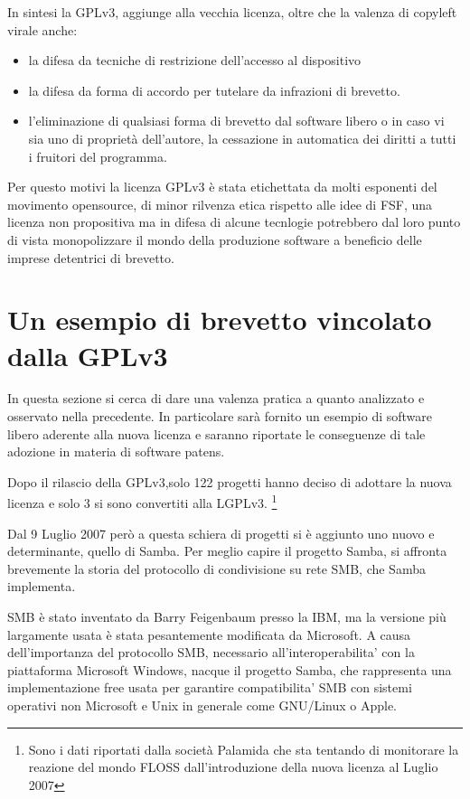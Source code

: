 In sintesi la GPLv3, aggiunge alla vecchia licenza, oltre che la valenza di copyleft virale anche:

\begin{itemize}
	\item  la difesa da tecniche di restrizione dell'accesso al dispositivo
	\item  la difesa da forma di accordo per tutelare da infrazioni di brevetto.
	\item  l'eliminazione di qualsiasi forma di brevetto dal software libero o in caso vi sia uno di proprietà dell'autore, la cessazione in automatica dei diritti a tutti i fruitori del programma.
\end{itemize}

Per questo motivi la licenza GPLv3 è stata etichettata da molti esponenti del movimento opensource, di minor rilvenza etica rispetto alle idee di FSF, una licenza non propositiva ma in difesa di alcune tecnlogie potrebbero dal loro punto di vista monopolizzare il mondo della produzione software a beneficio delle imprese detentrici di brevetto.





\section{Un esempio di brevetto vincolato dalla GPLv3}

In questa sezione si cerca di dare una valenza pratica a quanto analizzato e osservato nella precedente. In particolare sarà fornito un esempio di software libero aderente alla nuova licenza e saranno riportate le conseguenze di tale adozione in materia di software patens.

Dopo il rilascio della GPLv3,solo 122 progetti hanno deciso di adottare la nuova licenza e solo 3 si sono convertiti alla LGPLv3. \footnote{Sono i dati riportati dalla società Palamida che sta tentando di monitorare la reazione del mondo FLOSS dall’introduzione della nuova licenza al Luglio 2007}


Dal 9 Luglio 2007 però a questa schiera di progetti si è aggiunto uno nuovo e determinante, quello di Samba. Per meglio capire il progetto Samba, si affronta brevemente la storia del protocollo di condivisione su rete SMB, che Samba implementa.

SMB è stato inventato da Barry Feigenbaum presso la IBM, ma la versione più largamente usata è stata pesantemente modificata da Microsoft. A causa dell'importanza del protocollo SMB, necessario all'interoperabilita' con la piattaforma Microsoft Windows, nacque il progetto Samba, che rappresenta una implementazione free usata per garantire compatibilita' SMB con sistemi operativi non Microsoft e Unix in generale come GNU/Linux o Apple.

